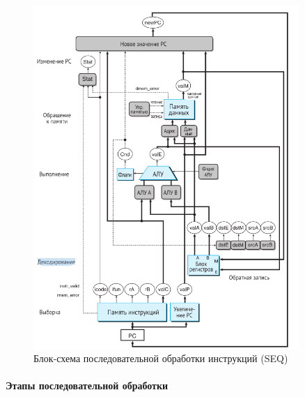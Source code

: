 \documentclass[12pt,a4paper]{article}
\begin{document}
\begin{figure}[ht!]
\centering
\includegraphics[width=0.9\textwidth]{seq.png}
\caption{Блок-схема последовательной обработки инструкций (SEQ)}
\label{fig:seq}
\end{figure}

\paragraph{Этапы последовательной обработки}
\end{document}
